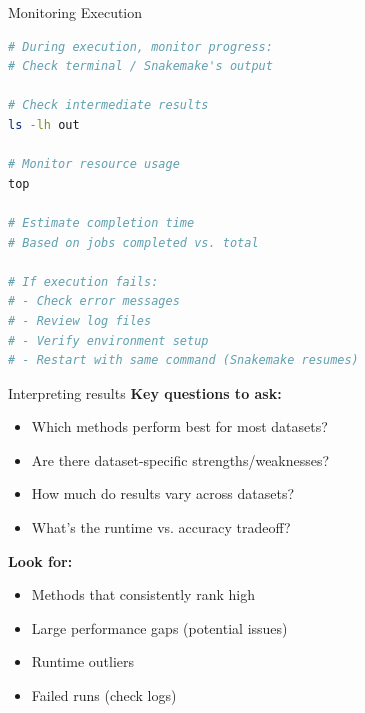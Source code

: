 \documentclass[aspectratio=169]{beamer}
\begin{document}
\begin{frame}[fragile]{Monitoring Execution}
\begin{lstlisting}[language=bash]
# During execution, monitor progress:
# Check terminal / Snakemake's output

# Check intermediate results
ls -lh out

# Monitor resource usage
top

# Estimate completion time
# Based on jobs completed vs. total

# If execution fails:
# - Check error messages
# - Review log files
# - Verify environment setup
# - Restart with same command (Snakemake resumes)
\end{lstlisting}
\end{frame}

\begin{frame}{Interpreting results}
    \textbf{Key questions to ask:}
    \begin{itemize}
        \item Which methods perform best for most datasets?
        \item Are there dataset-specific strengths/weaknesses?
        \item How much do results vary across datasets?
        \item What's the runtime vs. accuracy tradeoff?
    \end{itemize}
    
    \vspace{0.3cm}
    \textbf{Look for:}
    \begin{itemize}
        \item Methods that consistently rank high
        \item Large performance gaps (potential issues)
        \item Runtime outliers
        \item Failed runs (check logs)
    \end{itemize}
    
\end{frame}
\end{document}
